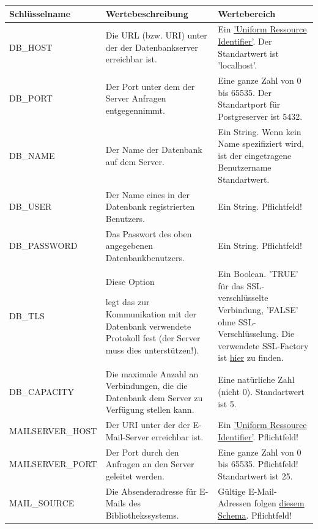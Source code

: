 \documentclass{article}
\begin{document}
\begin{center}
\begin{table}[H]
\hypertarget{tabelle}{}
\begin{tabular} {| m{4cm} | m{6cm} | m{5cm} |}
\hline
Schlüsselname & Wertebeschreibung & Wertebereich \\
\hline
DB\_HOST & Die URL (bzw. URI) unter der der Datenbankserver erreichbar ist.& Ein \hyperlink{https://datatracker.ietf.org/doc/html/rfc3986}{'Uniform Ressource Identifier'}. Der Standartwert ist 'localhost'.\\
\hline
DB\_PORT & Der Port unter dem der Server Anfragen entgegennimmt. & Eine ganze Zahl von 0 bis 65535. Der Standartport für Postgreserver ist 5432.\\
\hline
DB\_NAME & Der Name der Datenbank auf dem Server. & Ein String. Wenn kein Name spezifiziert wird, ist der eingetragene Benutzername Standartwert.\\
\hline
DB\_USER & Der Name eines in der Datenbank registrierten Benutzers. & Ein String. Pflichtfeld!\\
\hline
DB\_PASSWORD & Das Passwort des oben angegebenen Datenbankbenutzers. & Ein String. Pflichtfeld!\\
\hline
DB\_TLS &  \hypertarget{DBSSL}{Diese Option} legt das zur Kommunikation mit der Datenbank verwendete Protokoll fest (der Server muss dies unterstützen!). & Ein Boolean. 'TRUE' für das SSL-verschlüsselte Verbindung, 'FALSE' ohne SSL-Verschlüsselung. Die verwendete SSL-Factory ist \hyperlink{https://jdbc.postgresql.org/documentation/publicapi/org/postgresql/ssl/DefaultJavaSSLFactory.html}{hier} zu finden.\\ 
\hline
DB\_CAPACITY & Die maximale Anzahl an Verbindungen, die die Datenbank dem Server zu Verfügung stellen kann. & Eine natürliche Zahl (nicht 0). Standartwert ist 5.\\
\hline
MAILSERVER\_HOST & Der URI unter der der E-Mail-Server erreichbar ist. &  Ein \hyperlink{https://datatracker.ietf.org/doc/html/rfc3986}{'Uniform Ressource Identifier'}. Pflichtfeld! \\ 
\hline
MAILSERVER\_PORT & Der Port durch den Anfragen an den Server geleitet werden. & Eine ganze Zahl von 0 bis 65535. Pflichtfeld! Standartwert ist 25. \\
\hline
MAIL\_SOURCE & Die Absenderadresse für E-Mails des Bibliothekssystems. & Gültige E-Mail-Adressen folgen \hyperlink{https://datatracker.ietf.org/doc/html/rfc5322}{diesem Schema}. Pflichtfeld!\\
\hline

\end{tabular}
\end{table}
\end{center}
\end{document}
